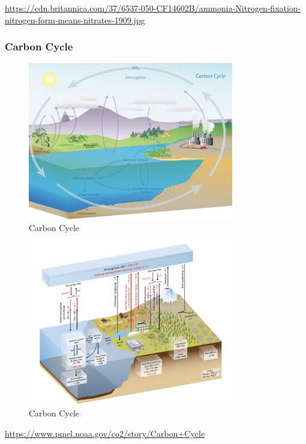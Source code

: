 \documentclass[
]{book}
\begin{document}
\url{https://cdn.britannica.com/37/6537-050-CF14602B/ammonia-Nitrogen-fixation-nitrogen-form-means-nitrates-1909.jpg}

\hypertarget{carbon-cycle}{%
\subsubsection{Carbon Cycle}\label{carbon-cycle}}

\begin{figure}
\centering
\includegraphics[width=0.8\textwidth,height=\textheight]{./Figures/Carbon2.png}
\caption{Carbon Cycle}
\end{figure}

\begin{figure}
\centering
\includegraphics[width=0.8\textwidth,height=\textheight]{./Figures/Carbon1.png}
\caption{Carbon Cycle}
\end{figure}

\url{https://www.pmel.noaa.gov/co2/story/Carbon+Cycle}
\end{document}
